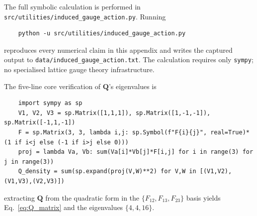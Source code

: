 The full symbolic calculation is performed in
\nolinkurl{src/utilities/induced_gauge_action.py}.  Running
\begin{verbatim}
    python -u src/utilities/induced_gauge_action.py
\end{verbatim}
reproduces every numerical claim in this appendix and writes the
captured output to \nolinkurl{data/induced_gauge_action.txt}.  The
calculation requires only \texttt{sympy}; no specialised lattice
gauge theory infrastructure.

The five-line core verification of $\mathbf{Q}$'s eigenvalues is
{\scriptsize
\begin{verbatim}
    import sympy as sp
    V1, V2, V3 = sp.Matrix([1,1,1]), sp.Matrix([1,-1,-1]), sp.Matrix([-1,1,-1])
    F = sp.Matrix(3, 3, lambda i,j: sp.Symbol(f"F{i}{j}", real=True)*(1 if i<j else (-1 if i>j else 0)))
    proj = lambda Va, Vb: sum(Va[i]*Vb[j]*F[i,j] for i in range(3) for j in range(3))
    Q_density = sum(sp.expand(proj(V,W)**2) for V,W in [(V1,V2),(V1,V3),(V2,V3)])
\end{verbatim}
}
extracting $\mathbf{Q}$ from the quadratic form in the $\{F_{12},F_{13},F_{23}\}$
basis yields Eq.~\eqref{eq:Q_matrix} and the eigenvalues
$\{4, 4, 16\}$.

